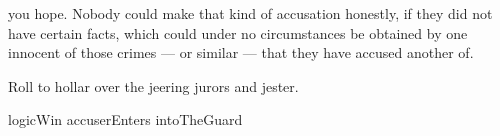you hope.
Nobody could make that kind of accusation honestly, if they did not have certain facts, which could under no circumstances be obtained by one innocent of those crimes --- or similar --- that they have accused another of.

Roll  to hollar over the jeering jurors and jester.

\begin{selectPath}
  {}%
  {logicWin}
  {}%
  {accuserEnters}
  {}%
  {intoTheGuard}
\end{selectPath}
